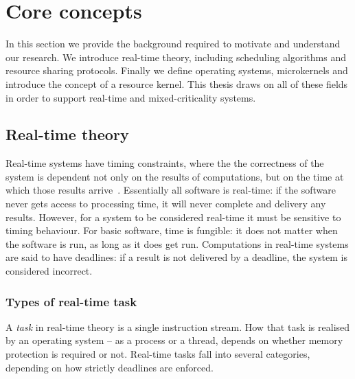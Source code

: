 




\chapter{Core concepts}
\label{chap:background}

In this section we provide the background required to motivate and understand our research.
We introduce real-time theory, including scheduling algorithms and resource sharing protocols.
Finally we define operating systems, microkernels and introduce the concept of a resource kernel.
This thesis draws on all of these fields in order to support real-time and mixed-criticality systems.

\section{Real-time theory}
\label{sec:real-time-theory}

Real-time systems have timing constraints, where the the correctness of the system is dependent not only on the results of computations, but on the time at which those results arrive~\citep{Stankovic_1988}.
Essentially all software is real-time: if the software never gets access to processing time, it will never complete and delivery any results.
However, for a system to be considered real-time it must be sensitive to timing behaviour.
For basic software, time is fungible: it does not matter when the software is run, as long as it does get run.
Computations in real-time systems are said to have deadlines: if a result is not delivered by a deadline, the system is considered incorrect.

\subsection{Types of real-time task}

A \emph{task} in real-time theory is a single instruction stream.
How that task is realised by an operating system -- as a process or a thread, depends on whether memory protection is required or not.
Real-time tasks fall into several categories, depending on how strictly deadlines are enforced.

